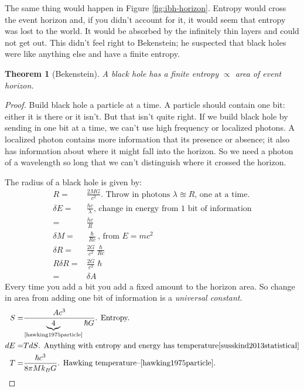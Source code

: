 \documentclass[]{article}
\newtheorem{thm}{Theorem}
\begin{document}
{\begin{appendices}
	The same thing would happen in Figure \ref{fig:ibh-horizon}. Entropy would cross the event horizon and, if you didn't account for it, it would seem that entropy was lost to the world. It would be absorbed by the infinitely thin layers and could not get out. This didn't feel right to Bekenstein; he suspected that black holes were like anything else and have a finite entropy.
	
	\begin{thm}[Bekenstein]
		A black hole has a finite entropy $\propto$ area of event horizon.
	\end{thm}

	\begin{proof}
		Build black hole a particle at a time. A particle should contain one bit: either it is there or it isn't. But that isn't quite right. If we build black hole by sending in one bit at a time, we can't use high frequency or localized photons. A localized photon contains more information that its presence or absence; it also has information about where it might fall into the horizon. So we need a photon of a wavelength so long that we can't distinguish where it crossed the horizon.
		
		The radius of a black hole is given by:
		\begin{align*}
			R =& \frac{2 M G}{c^2} \text{. Throw in photons $\lambda\approxeq R$, one at a time.}\\
			\delta E =& \frac{hc}{\lambda} \text{, change in energy from 1 bit of information}\\
			=& \frac{hc}{R}\\
			\delta M =& \frac{\hslash}{Rc} \text{, from $E=mc^2$}\\
			\delta R =& \frac{2G}{c^2}  \frac{\hslash}{Rc}\\
			R \delta R=& \frac{2G}{c^3}  \hslash\\
			=& \delta A
		\end{align*}
		Every time you add a bit you add a fixed amount to the horizon  area. So change in area from adding one bit of information is a \emph{universal constant}.
		\begin{align*}
			S =& \frac{A c^3}{\underbrace{4}_\text{\cite{hawking1975particle}} \hslash G} \text{. Entropy.}\\
			dE =& T dS \text{. Anything with entropy and energy has temperature\cite{susskind2013statistical}}\\
			T =& \frac{\hslash  c^3}{8 \pi M k_B G} \text{. Hawking temperature--\cite{hawking1975particle}.}
		\end{align*}
	\end{proof}


\end{appendices}}
\end{document}
